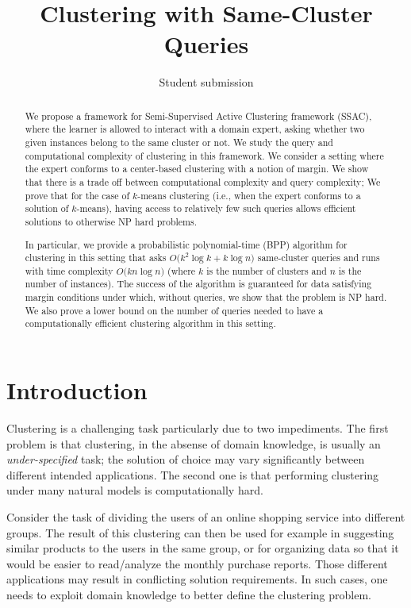 \documentclass{article}
\title{Clustering with Same-Cluster Queries}
\author{Student submission}
\begin{document}
\maketitle

\begin{abstract}
We propose a framework for Semi-Supervised Active Clustering framework (SSAC), where the learner is allowed to interact with a domain expert, asking whether two given instances belong to the same cluster or not. We study the query and computational complexity of clustering in this framework. We consider a setting where the expert conforms to a center-based clustering with a notion of margin.  We show that there is a trade off between computational complexity and query complexity; We prove that for the case of $k$-means clustering (i.e., when the expert conforms to a solution of $k$-means), having access to relatively few such queries allows efficient solutions to otherwise NP hard problems.

In particular, we provide a probabilistic polynomial-time (BPP) algorithm  for clustering in this setting that asks $O\big(k^2\log k + k\log n)$ same-cluster queries and runs with time complexity $O\big(kn\log n)$ (where $k$ is the number of clusters and $n$ is the number of instances). The success of the algorithm is guaranteed for data satisfying margin conditions under which, without queries, we show that the problem is NP hard. We also prove a lower bound on the number of queries needed to have a computationally efficient clustering algorithm in this setting.
\end{abstract}

\section{Introduction}

Clustering is a challenging task particularly due to two impediments. The first problem is that clustering, in the absense of domain knowledge, is usually an \emph{under-specified} task; the solution of choice may vary significantly between different intended applications. The second one is that performing clustering under many natural models is computationally hard.

Consider the task of dividing the users of an online shopping service into different groups. The result of this clustering can then be used for example in suggesting similar products to the users in the same group, or for organizing data so that it would be easier to read/analyze the monthly purchase reports. Those different applications may result in conflicting solution requirements. In such cases, one needs to exploit domain knowledge to better define the clustering problem.
\end{document}
